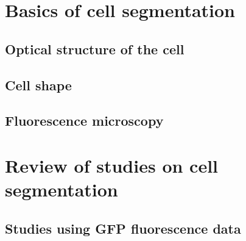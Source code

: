 
\section{Basics of cell segmentation}

\subsection{Optical structure of the cell}


\subsection{Cell shape}


\subsection{Fluorescence microscopy}


\section{Review of studies on cell segmentation}

\subsection{Studies using GFP fluorescence data}

